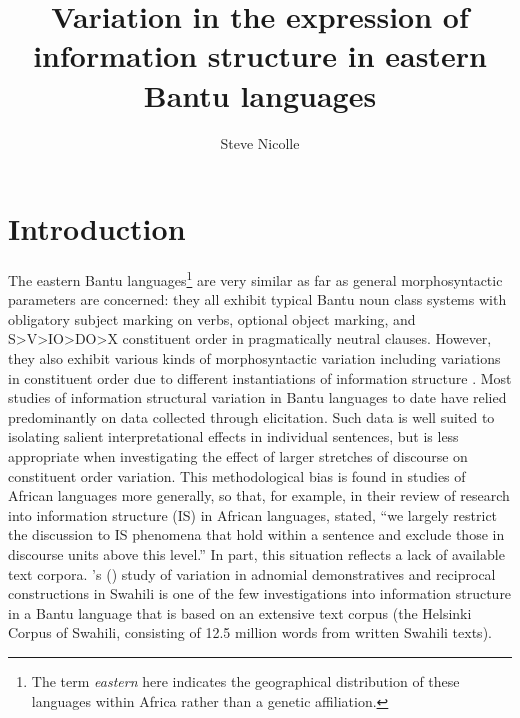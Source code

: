 \documentclass[output=paper]{langsci/langscibook}
\title{Variation in the expression of information structure in eastern {Bantu} languages}
\author{%
Steve Nicolle\affiliation{Canada Institute of Linguistics / SIL International} 
}
\begin{document}
 


\section{Introduction}\label{§1:introduction.nicolle}

The eastern Bantu languages\footnote{The term \textit{eastern} here indicates the geographical distribution of these languages within Africa rather than a genetic affiliation.} are very similar as far as general morphosyntactic parameters are concerned: they all exhibit typical Bantu noun class systems with obligatory subject marking on verbs, optional object marking, and S>V>IO>DO>X constituent order in pragmatically neutral clauses. However, they also exhibit various kinds of morphosyntactic variation \citep{martenetal2007,vanderwalbiberauer2014} including variations in constituent order due to different instantiations of information structure \citep{zerbian2006,buelletal2011,yoneda2011,downinghyman2016}. Most studies of information structural variation in Bantu languages to date have relied predominantly on data collected through elicitation. Such data is well suited to isolating salient interpretational effects in individual sentences, but is less appropriate when investigating the effect of larger stretches of discourse on constituent order variation. This methodological bias is found in studies of African languages more generally, so that, for example, \citet[157]{gueldemannetal2015} in their review of research into information structure (IS) in African languages, stated, “we largely restrict the discussion to IS phenomena that hold within a sentence and exclude those in discourse units above this level.” In part, this situation reflects a lack of available text corpora. \citeauthor{mwamzandi2014}’s (\citeyear{mwamzandi2014}) study of variation in adnomial demonstratives and reciprocal constructions in Swahili is one of the few investigations into information structure in a Bantu language that is based on an extensive text corpus (the Helsinki Corpus of Swahili, consisting of 12.5 million words from written Swahili texts).
\end{document}
